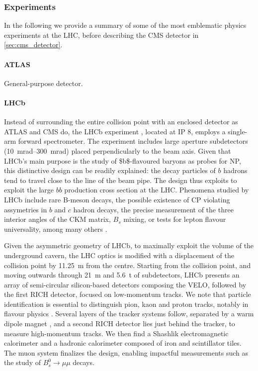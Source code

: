 \documentclass[11pt]{article}
\begin{document}
\subsubsection{Experiments}
\label{sec:org4c2fe44}
\label{sec:lhc_experiments}

In the following we provide a summary of some of the most emblematic physics experiments at the \ac{LHC}, before describing the \ac{CMS} detector in \cref{sec:cms_detector}.

\paragraph{ATLAS}
General-purpose detector. \cite{atlas_collab}

\paragraph{LHCb}

Instead of surrounding the entire collision point with an enclosed detector as \ac{ATLAS} and \ac{CMS} do, the \ac{LHCb} experiment \cite{lhcb_collab}, located at \ac{IP} 8, employs a single-arm forward spectrometer.
The experiment includes large aperture subdetectors (\SIrange{10}{300}{\milli\radian}) placed perpendicularly to the beam axis.
Given that \ac{LHCb}'s main purpose is the study of \$b\$-flavoured baryons as probes for \ac{NP}, this distinctive design can be readily explained: the decay particles of \(b\) hadrons tend to travel close to the line of the beam pipe.
The design thus exploits to exploit the large \(bb\) production cross section at the \ac{LHC}.
Phenomena studied by \ac{LHCb} include rare B-meson decays, the possible existence of \ac{CP} violating assymetries in \(b\) and \(c\) hadron decays, the precise measurement of the three interior angles of the \ac{CKM} matrix, \(B_{s}\) mixing, or tests for lepton flavour universality, among many others \cite{lhcb_hllhc_tdr}.

Given the asymmetric geometry of LHCb, to maximally exploit the volume of the underground cavern, the LHC optics is modified  with a displacement of the collision point by \SI{11.25}{\m} from the centre.
Starting from the collision point, and moving outwards through \SI{21}{\m} and \SI{5.6}{\tonne} of subdetectors, \ac{LHCb} presents an array of semi-circular silicon-based detectors composing the \ac{VELO}, followed by the first \ac{RICH} detector, focused on low-momentum tracks.
We note that particle identification is essential to distinguish pion, kaon and proton tracks, notably in flavour physics \cite{lhcb_hllhc_tdr}.
Several layers of the tracker systems follow, separated by a warm dipole magnet \cite{lhcb_collab_tracker_tdr}, and a second \ac{RICH} detector lies just behind the tracker, to measure high-momentum tracks.
We then find a Shashlik electromagnetic calorimeter and a hadronic calorimeter composed of iron and scintillator tiles.
The muon system finalizes the design, enabling impactful measurements such as the study of \(B_{s}^{0}\rightarrow\mu\mu\) decays.
\end{document}
